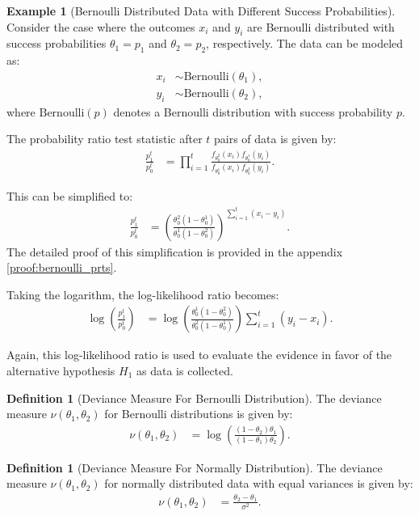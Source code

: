 \documentclass[magisterska, english]{pwr_wmat_praca_dyplomowa}
\theoremstyle{plain}
\numberwithin{theorem}{chapter}
\theoremstyle{definition}
\numberwithin{theorem}{chapter}
\newtheorem{definition}[theorem]{Definition}
\newtheorem{example}[theorem]{Example}
\begin{document}
\begin{example}[Bernoulli Distributed Data with Different Success Probabilities]
	Consider the case where the outcomes \(x_i\) and \(y_i\) are Bernoulli distributed with success probabilities \(\theta_1 = p_1\) and \(\theta_2 = p_2\), respectively. The data can be modeled as:
	\begin{align*}
		x_i &\sim \text{Bernoulli}(\theta_1), \\
		y_i &\sim \text{Bernoulli}(\theta_2),
	\end{align*}
	where \(\text{Bernoulli}(p)\) denotes a Bernoulli distribution with success probability \(p\).
	
	The probability ratio test statistic after \(t\) pairs of data is given by:
	\begin{align*}
	\frac{p_1^t}{p_0^t} &= \prod_{i=1}^{t} \frac{f_{\theta_0^2}(x_i) f_{\theta_0^1}(y_i)}{f_{\theta_0^1}(x_i) f_{\theta_0^2}(y_i)}.
	\end{align*}

	This can be simplified to:
	\begin{align}\label{eqn:binomial_prts}
		\frac{p_1^t}{p_0^t} &= \left(\frac{\theta_0^2(1-\theta_0^1)}{\theta_0^1(1-\theta_0^2)}\right)^{\sum_{i=1}^{t} (x_i - y_i)}.
	\end{align}
	The detailed proof of this simplification is provided in the appendix \ref{proof:bernoulli_prts}.
	
	Taking the logarithm, the log-likelihood ratio becomes:
	\begin{align*}
		\log \left(\frac{p_1^t}{p_0^t}\right) &= \log \left(\frac{\theta_0^1(1-\theta_0^2)}{\theta_0^2(1-\theta_0^1)}\right)\sum_{i=1}^{t} (y_i - x_i).
	\end{align*}
	
	Again, this log-likelihood ratio is used to evaluate the evidence in favor of the alternative hypothesis \(H_1\) as data is collected.
\end{example}

\begin{definition}[Deviance Measure For Bernoulli Distribution]
	The deviance measure \(\nu(\theta_1, \theta_2)\) for Bernoulli distributions is given by:
	\begin{align*}
		\nu(\theta_1, \theta_2) &= \log \left(\frac{(1 - \theta_2)\theta_1}{(1 - \theta_1)\theta_2} \right).
	\end{align*}
\end{definition}

\begin{definition}[Deviance Measure For Normally Distribution]
	The deviance measure \(\nu(\theta_1, \theta_2)\) for normally distributed data with equal variances is given by:
	\begin{align*}
		\nu(\theta_1, \theta_2) &= \frac{\theta_2 - \theta_1}{\sigma^2}.
	\end{align*}
\end{definition}
\end{document}
